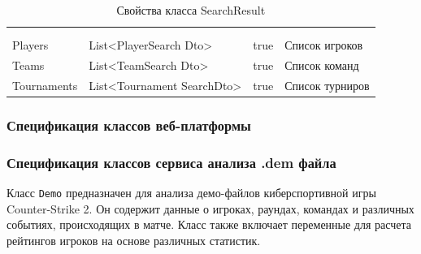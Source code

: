 \begin{xltabular}{\textwidth}{|X|X|X|X|}
	\caption{Свойства класса SearchResult}\label{table:SearchResult}\\ \hline
	 &  &  &  \\ \hline
	 &  &  &  \\ \hline
	\endfirsthead
	 \hline
	 &  &  &  \\ \hline
	\endhead
	Players & List<PlayerSearch
	Dto> & true & Список игроков \\ \hline
	Teams & List<TeamSearch
	Dto> & true & Список команд \\ \hline
	Tournaments & List<Tournament
	SearchDto> & true & Список турниров \\ \hline
\end{xltabular}

\subsubsection{Спецификация классов веб-платформы}
\subsubsection{Спецификация классов сервиса анализа .dem файла}

Класс \texttt{Demo} предназначен для анализа демо-файлов киберспортивной игры Counter-Strike 2. Он содержит данные о игроках, раундах, командах и различных событиях, происходящих в матче. Класс также включает переменные для расчета рейтингов игроков на основе различных статистик.

